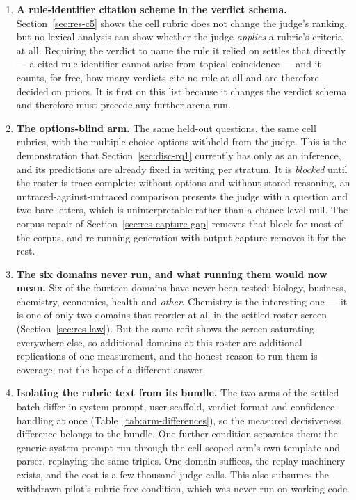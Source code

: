 \begin{enumerate}

\item \textbf{A rule-identifier citation scheme in the verdict schema.}
Section~\ref{sec:res-c5} shows the cell rubric does not change the
judge's ranking, but no lexical analysis can show whether the judge
\emph{applies} a rubric's criteria at all. Requiring the verdict to
name the rule it relied on settles that
directly --- a cited rule identifier cannot arise from topical
coincidence --- and it counts, for free, how many verdicts cite no rule
at all and are therefore decided on priors. It is first on this list
because it changes the verdict schema and therefore must precede any
further arena run.

\item \textbf{The options-blind arm.} The same held-out questions, the
same cell rubrics, with the multiple-choice options withheld from the
judge. This is the demonstration that Section~\ref{sec:disc-rq1}
currently has only as an inference, and its predictions are already
fixed in writing per stratum. It is \emph{blocked} until the roster is
trace-complete: without options and without stored reasoning, an
untraced-against-untraced comparison presents the judge with a question
and two bare letters, which is uninterpretable rather than a
chance-level null. The corpus repair of
Section~\ref{sec:res-capture-gap} removes that block for most of the
corpus, and re-running generation with output capture removes it for
the rest.

\item \textbf{The six domains never run, and what running them would
now mean.} Six of the fourteen domains have never been tested:
biology, business, chemistry, economics, health and \emph{other}.
Chemistry is the interesting one --- it is one of only two domains
that reorder at all in the settled-roster screen
(Section~\ref{sec:res-law}). But the same refit shows the screen
saturating everywhere else, so additional domains at this roster are
additional replications of one measurement, and the honest reason to
run them is coverage, not the hope of a different answer.

\item \textbf{Isolating the rubric text from its bundle.} The two arms
of the settled batch differ in system prompt, user scaffold, verdict
format and confidence handling at once
(Table~\ref{tab:arm-differences}), so the measured decisiveness
difference belongs to the bundle. One further condition separates
them: the generic system prompt run through the cell-scoped arm's own
template and parser, replaying the same triples. One domain suffices,
the replay machinery exists, and the cost is a few thousand judge
calls. This also subsumes the withdrawn pilot's rubric-free condition,
which was never run on working code.


\end{enumerate}
